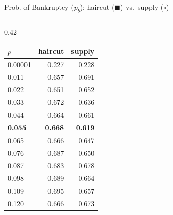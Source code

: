 \documentclass[aspectratio=169,10pt]{beamer}
\begin{document}
\begin{frame}{Prob. of Bankruptcy ($p_b$): haircut ($\blacksquare$) vs.\ supply ($\circ$)}
\begin{columns}[T]
\begin{column}{0.42\textwidth}
\begin{tabular}{lrr}
        \toprule
        $p$ & haircut & supply \\
        \midrule
        0.00001 & 0.227 & 0.228 \\
        0.011 & 0.657 & 0.691 \\
        0.022 & 0.651 & 0.652 \\
        0.033 & 0.672 & 0.636 \\
        0.044 & 0.664 & 0.661 \\
        \textbf{0.055} & \textbf{0.668} & \textbf{0.619} \\
        0.065 & 0.666 & 0.647 \\
        0.076 & 0.687 & 0.650 \\
        0.087 & 0.683 & 0.678 \\
        0.098 & 0.689 & 0.664 \\
        0.109 & 0.695 & 0.657 \\
        0.120 & 0.666 & 0.673 \\
        \bottomrule
      \end{tabular}
    \end{column}
  \end{columns}
\end{frame}
\end{document}
